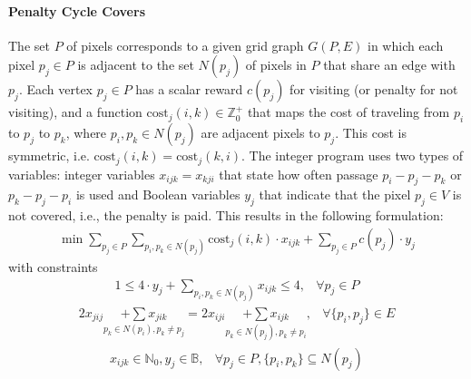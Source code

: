 \paragraph{Penalty Cycle Covers}
The set $P$ of pixels corresponds to a given grid graph $G(P,E)$ in which each pixel $p_j\in P$ is adjacent to the set $N(p_j)$
of pixels in $P$ that share an edge with $p_j$.
Each vertex $p_j\in P$ has a scalar reward $c(p_j)$ for visiting (or penalty for not visiting), 
and a function $\text{cost}_j(i,k)\in \mathbb{Z}^+_0$  that maps the cost of traveling from $p_i$ to $p_j$ to $p_k$, where  $p_i,p_k\in N(p_j)$ are adjacent pixels to   $p_j$.
This cost is symmetric, i.e. $\text{cost}_j(i,k)=\text{cost}_j(k,i)$. %
The integer program uses two types of variables: integer variables
$x_{ijk}=x_{kji}$ that state how often passage $p_i-p_j-p_k$ or $p_k-p_j-p_i$ is used and
Boolean variables $y_{j}$ that indicate that the pixel $p_j\in V$ is not covered,
i.e., the penalty is paid.  This results in the following formulation: 
\begin{eqnarray}
	\min  \displaystyle  \sum_{p_j\in P} \sum_{p_i,p_k\in N(p_j)} \text{cost}_j(i,k) \cdot x_{ijk} + \sum_{p_j\in P}c(p_j) \cdot y_j\label{eq:obj}
\end{eqnarray}
with constraints
\begin{eqnarray}
	 1\leq\displaystyle 4 \cdot y_j +\sum_{p_i,p_k\in N(p_j)} x_{ijk} \leq 4, &\forall p_j\in P \label{eq:ip:constr1}
\end{eqnarray}
\begin{eqnarray}	
	\displaystyle 2 x_{jij}  \!\!\!   \underset{ p_k\in N(p_i), p_k\not = p_j}{+\sum x_{jik}}  \!\!\!\!\!    = 2  x_{iji} \!\!\!     \underset{p_k\in N(p_j), p_k\not= p_i}{+\sum x_{ijk}},  & \forall \{p_i,p_j\}\in E \label{eq:ip:constr2}
\end{eqnarray}
\begin{eqnarray}	
	 x_{ijk}\in\mathbb{N}_0, y_j\in \mathbb{B} ,& \forall p_j\in P, \{p_i,p_k\}\subseteq N(p_j)  \label{eq:ip:constrINTS}
\end{eqnarray}


